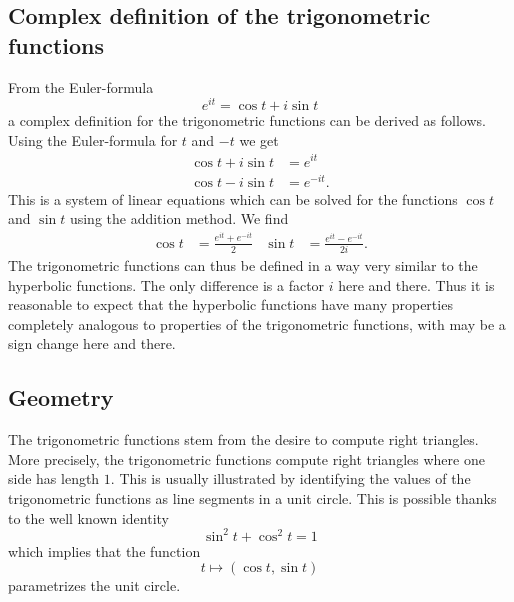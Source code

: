 \subsection{Complex definition of the trigonometric functions}
From the Euler-formula
\[
e^{it}=\cos t+i\sin t
\]
a complex definition for the trigonometric functions can be derived
as follows.
Using the Euler-formula for $t$ and $-t$ we get
\begin{align*}
\cos t+i\sin t&=e^{it}\\
\cos t-i\sin t&=e^{-it}.
\end{align*}
This is a system of linear equations which can be solved
for the functions $\cos t$ and $\sin t$ using the addition method.
We find
\begin{align*}
\cos t
&=
\frac{e^{it}+e^{-it}}2
&
\sin t
&=
\frac{e^{it}-e^{-it}}{2i}.
\end{align*}
The trigonometric functions can thus be defined in a way very similar
to the hyperbolic functions.
The only difference is a factor $i$ here and there.
Thus it is reasonable to expect that the hyperbolic functions
have many properties completely analogous to properties of the
trigonometric functions, with may be a sign change here and there.

\subsection{Geometry}
The trigonometric functions stem from the desire to compute right
triangles.
More precisely, the trigonometric functions compute right triangles
where one side has length $1$.
This is usually illustrated by identifying the values of the
trigonometric functions as line segments in a unit circle.
This is possible thanks to the well known identity
\[
\sin^2t+\cos^2t=1
\]
which implies that the function
\[
t\mapsto (\cos t,\sin t)
\]
parametrizes the unit circle.

